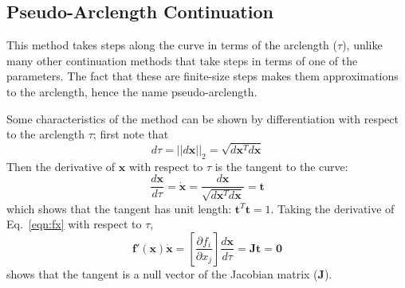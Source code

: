 \documentclass[11pt,openany,twoside]{book}
\numberwithin{equation}{section}		%
\newcommand{\Newterm}[1]{{\em #1}}
\newcommand{\Matrix}[1]{\boldsymbol{#1}}
\newcommand{\Vector}[1]{\boldsymbol{#1}}
\newcommand{\Eqn}[1]{Eq.\ \ref{#1}}  %
\begin{document}
\subsection{Pseudo-Arclength Continuation}\label{sect:pseudo}
This method takes steps along the curve in terms of the arclength ($\tau$),
unlike many other continuation methods that take steps in terms of
one of the parameters. The fact that these are finite-size steps makes them
approximations to the arclength, hence the name pseudo-arclength.
\par

Some characteristics of the method can be shown by differentiation
with respect to the arclength $\tau$; first note that
\begin{equation}
d\tau = ||d\Vector{x}||_2 = \sqrt{d\Vector{x}^Td\Vector{x}}
\end{equation}
Then the derivative of $\Vector{x}$ with respect to $\tau$ is the
tangent to the curve:
\begin{equation}\label{eqn:t-properties}
\frac{d\Vector{x}}{d\tau} = \dot{\Vector{x}} =
 	\frac{d\Vector{x}}{\sqrt{d\Vector{x}^T d\Vector{x}}} = \Vector{t}
\end{equation}
which shows that the tangent has unit length: $\Vector{t}^T\Vector{t} = 1$.
Taking the derivative of \Eqn{eqn:fx} with respect to $\tau$,
\begin{equation}\label{eqn:fxprime}
\Vector{f}'(\Vector{x})\dot{\Vector{x}} =
	\left[\frac{\partial f_i}{\partial x_j}\right]\frac{d\Vector{x}}{d\tau}
	= \Matrix{J}\Vector{t} = \Vector{0}
\end{equation}
shows that the tangent is a null vector of the Jacobian matrix ($\Matrix{J}$).

\end{document}
